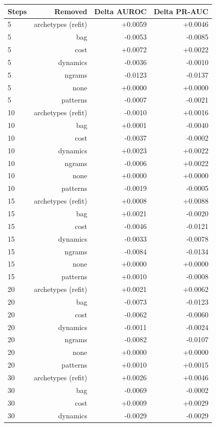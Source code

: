 \begin{tabular}{lrrr}
\toprule
Steps & Removed & Delta AUROC & Delta PR-AUC \\
\midrule
5 & archetypes (refit) & +0.0059 & +0.0046 \\
5 & bag & -0.0053 & -0.0085 \\
5 & cost & +0.0072 & +0.0022 \\
5 & dynamics & -0.0036 & -0.0010 \\
5 & ngrams & -0.0123 & -0.0137 \\
5 & none & +0.0000 & +0.0000 \\
5 & patterns & -0.0007 & -0.0021 \\
10 & archetypes (refit) & -0.0010 & +0.0016 \\
10 & bag & +0.0001 & -0.0040 \\
10 & cost & -0.0037 & -0.0002 \\
10 & dynamics & +0.0023 & +0.0022 \\
10 & ngrams & -0.0006 & +0.0022 \\
10 & none & +0.0000 & +0.0000 \\
10 & patterns & -0.0019 & -0.0005 \\
15 & archetypes (refit) & +0.0008 & +0.0088 \\
15 & bag & +0.0021 & -0.0020 \\
15 & cost & -0.0046 & -0.0121 \\
15 & dynamics & -0.0033 & -0.0078 \\
15 & ngrams & -0.0084 & -0.0134 \\
15 & none & +0.0000 & +0.0000 \\
15 & patterns & +0.0010 & -0.0008 \\
20 & archetypes (refit) & +0.0021 & +0.0062 \\
20 & bag & -0.0073 & -0.0123 \\
20 & cost & -0.0062 & -0.0060 \\
20 & dynamics & -0.0011 & -0.0024 \\
20 & ngrams & -0.0082 & -0.0107 \\
20 & none & +0.0000 & +0.0000 \\
20 & patterns & +0.0010 & +0.0015 \\
30 & archetypes (refit) & +0.0026 & +0.0046 \\
30 & bag & -0.0069 & -0.0002 \\
30 & cost & +0.0009 & +0.0029 \\
30 & dynamics & -0.0029 & -0.0029 \\

\end{tabular}
